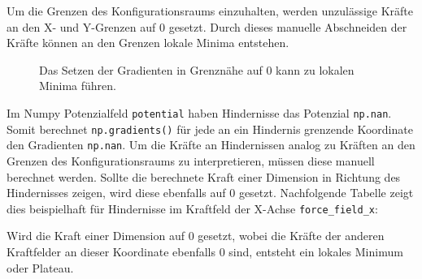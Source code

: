 Um die Grenzen des Konfigurationsraums einzuhalten, werden unzulässige Kräfte an den X- und Y-Grenzen auf $0$ gesetzt. Durch dieses manuelle Abschneiden der Kräfte können an den Grenzen lokale Minima entstehen.
\begin{figure}[H]
	\centering
	\footnotesize
	\centerline{\resizebox{0.65\linewidth}{!}{}}
	\caption{Das Setzen der Gradienten in Grenznähe auf $0$ kann zu lokalen Minima führen.}
\end{figure}
\vspace*{-0.1cm}
Im Numpy Potenzialfeld \texttt{potential} haben Hindernisse das Potenzial \texttt{np.nan}. Somit berechnet \texttt{np.gradients()} für jede an ein Hindernis grenzende Koordinate den Gradienten \texttt{np.nan}.
Um die Kräfte an Hindernissen analog zu Kräften an den Grenzen des Konfigurationsraums zu interpretieren, müssen diese manuell berechnet werden. 
Sollte die berechnete Kraft einer Dimension in Richtung des Hindernisses zeigen, wird diese ebenfalls auf $0$ gesetzt. Nachfolgende Tabelle zeigt dies beispielhaft für Hindernisse im Kraftfeld der X-Achse \texttt{force\_field\_x}:
\begin{table}[H]
\centerline{}
\end{table}
Wird die Kraft einer Dimension auf $0$ gesetzt, wobei die Kräfte der anderen Kraftfelder an dieser Koordinate ebenfalls $0$ sind, entsteht ein lokales Minimum oder Plateau.

